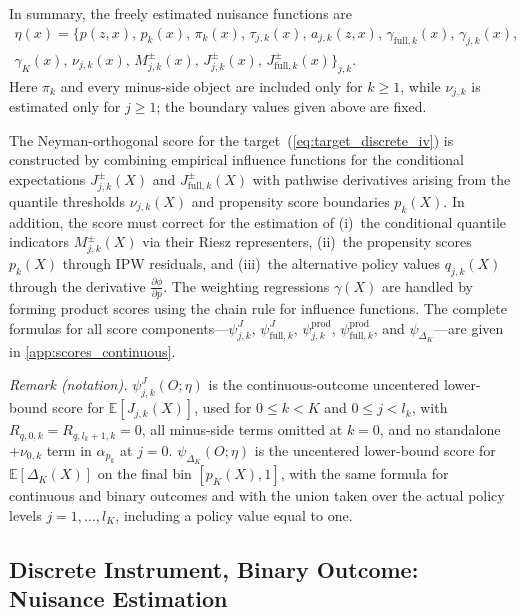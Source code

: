 In summary, the freely estimated nuisance functions are
\begin{multline*}
\eta(x) =  \bigl\{p( z,x) ,\, p_{k}( x) ,\, \pi _{k}( x),\, \tau_{j,k}(x),\, a_{j,k}(z,x),\, \gamma_{\text{full},k}(x),\, \gamma_{j,k}(x), \\
\gamma_K(x) ,\, \nu _{j,k}( x),\, M_{j,k}^{\pm}(x),\, J_{j,k}^{\pm}( x),\, J_{\text{full} ,k}^{\pm}(x)\bigr\}_{j,k}.
\end{multline*}
Here $\pi_k$ and every minus-side object are included only for $k\geqslant1$, while $\nu_{j,k}$ is estimated only for $j\geqslant1$; the boundary values given above are fixed.

The Neyman-orthogonal score for the target~(\ref{eq:target_discrete_iv}) is constructed by combining empirical influence functions for the conditional expectations $J_{j,k}^{\pm}(X)$ and $J_{\mathrm{full},k}^{\pm}(X)$ with pathwise derivatives arising from the quantile thresholds $\nu_{j,k}(X)$ and propensity score boundaries $p_k(X)$. In addition, the score must correct for the estimation of (i)~the conditional quantile indicators $M_{j,k}^{\pm}(X)$ via their Riesz representers, (ii)~the propensity scores $p_k(X)$ through IPW residuals, and (iii)~the alternative policy values $q_{j,k}(X)$ through the derivative $\frac{\partial \phi}{\partial p}$. The weighting regressions $\gamma(X)$ are handled by forming product scores using the chain rule for influence functions. The complete formulas for all score components---$\psi_{j,k}^J$, $\psi_{\mathrm{full},k}^J$, $\psi_{j,k}^{\mathrm{prod}}$, $\psi_{\mathrm{full},k}^{\mathrm{prod}}$, and $\psi_{\Delta_K}$---are given in \cref{app:scores_continuous}.

\noindent\textit{Remark (notation).} $\psi_{j,k}^{J}(O;\eta)$ is the continuous-outcome uncentered lower-bound score for $\mathbb E[J_{j,k}(X)]$, used for $0\leq k<K$ and $0\leq j<l_k$, with $R_{q,0,k}=R_{q,l_k+1,k}=0$, all minus-side terms omitted at $k=0$, and no standalone $+\nu_{0,k}$ term in $\alpha_{p_k}$ at $j=0$. $\psi_{\Delta_K}(O;\eta)$ is the uncentered lower-bound score for $\mathbb E[\Delta_K(X)]$ on the final bin $[p_K(X),1]$, with the same formula for continuous and binary outcomes and with the union taken over the actual policy levels $j=1,\ldots,l_K$, including a policy value equal to one.


\subsection{Discrete Instrument, Binary Outcome: Nuisance Estimation}\label{app:procedure_binary_outcome}

